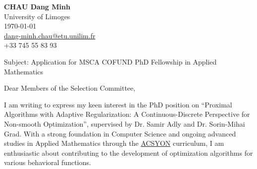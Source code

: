 \documentclass[11pt]{report}
\begin{document}
\setlength{\parindent}{0pt}
\begin{titlepage}


    \begin{minipage}[t]{0.95\textwidth}
        \hfill
        \raggedleft
        \textbf{CHAU Dang Minh} \\
        University of Limoges \\
        \today\\
        \href{mailto:dang-minh.chau@etu.unilim.fr}{dang-minh.chau@etu.unilim.fr} \\
        +33 745 55 83 93 \\
    \end{minipage}

    \vspace{0.7em}

    \raggedright Subject: Application for MSCA COFUND PhD Fellowship in Applied Mathematics

    \vspace{0.7em}

    Dear Members of the Selection Committee,

    \vspace{0.7em}

    I am writing to express my keen interest in the PhD position on ``Proximal Algorithms with Adaptive Regularization: A Continuous-Discrete Perspective for Non-smooth Optimization'', supervised by Dr. Samir Adly and Dr. Sorin-Mihai Grad. With a strong foundation in Computer Science and ongoing advanced studies in Applied Mathematics through the \href{https://www.unilim.fr/acsyon/}{ACSYON} curriculum, I am enthusiastic about contributing to the development of optimization algorithms for various behavioral functions.

    \vspace{0.7em}


\end{titlepage}
\end{document}
